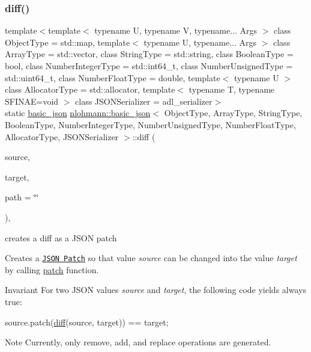 \subsubsection{\texorpdfstring{diff()}{diff()}}
{\footnotesize\ttfamily template$<$template$<$ typename U, typename V, typename... Args $>$ class Object\+Type = std\+::map, template$<$ typename U, typename... Args $>$ class Array\+Type = std\+::vector, class String\+Type  = std\+::string, class Boolean\+Type  = bool, class Number\+Integer\+Type  = std\+::int64\+\_\+t, class Number\+Unsigned\+Type  = std\+::uint64\+\_\+t, class Number\+Float\+Type  = double, template$<$ typename U $>$ class Allocator\+Type = std\+::allocator, template$<$ typename T, typename S\+F\+I\+N\+A\+E=void $>$ class J\+S\+O\+N\+Serializer = adl\+\_\+serializer$>$ \\
static \mbox{\hyperlink{classnlohmann_1_1basic__json}{basic\+\_\+json}} \mbox{\hyperlink{classnlohmann_1_1basic__json}{nlohmann\+::basic\+\_\+json}}$<$ Object\+Type, Array\+Type, String\+Type, Boolean\+Type, Number\+Integer\+Type, Number\+Unsigned\+Type, Number\+Float\+Type, Allocator\+Type, J\+S\+O\+N\+Serializer $>$\+::diff (\begin{DoxyParamCaption}\item[{const \mbox{\hyperlink{classnlohmann_1_1basic__json}{basic\+\_\+json}}$<$ Object\+Type, Array\+Type, String\+Type, Boolean\+Type, Number\+Integer\+Type, Number\+Unsigned\+Type, Number\+Float\+Type, Allocator\+Type, J\+S\+O\+N\+Serializer $>$ \&}]{source,  }\item[{const \mbox{\hyperlink{classnlohmann_1_1basic__json}{basic\+\_\+json}}$<$ Object\+Type, Array\+Type, String\+Type, Boolean\+Type, Number\+Integer\+Type, Number\+Unsigned\+Type, Number\+Float\+Type, Allocator\+Type, J\+S\+O\+N\+Serializer $>$ \&}]{target,  }\item[{const std\+::string \&}]{path = {\ttfamily \char`\"{}\char`\"{}} }\end{DoxyParamCaption})\hspace{0.3cm}{\ttfamily [inline]}, {\ttfamily [static]}}



creates a diff as a J\+S\+ON patch 

Creates a \href{http://jsonpatch.com}{\tt J\+S\+ON Patch} so that value {\itshape source} can be changed into the value {\itshape target} by calling \mbox{\hyperlink{classnlohmann_1_1basic__json_a81e0c41a4a9dff4df2f6973f7f8b2a83}{patch}} function.

\begin{DoxyInvariant}{Invariant}
For two J\+S\+ON values {\itshape source} and {\itshape target}, the following code yields always {\ttfamily true}\+: 
\begin{DoxyCode}
source.patch(\mbox{\hyperlink{classnlohmann_1_1basic__json_a543bd5f7490de54c875b2c0912dc9a49}{diff}}(source, target)) == target;
\end{DoxyCode}

\end{DoxyInvariant}
\begin{DoxyNote}{Note}
Currently, only {\ttfamily remove}, {\ttfamily add}, and {\ttfamily replace} operations are generated.
\end{DoxyNote}

